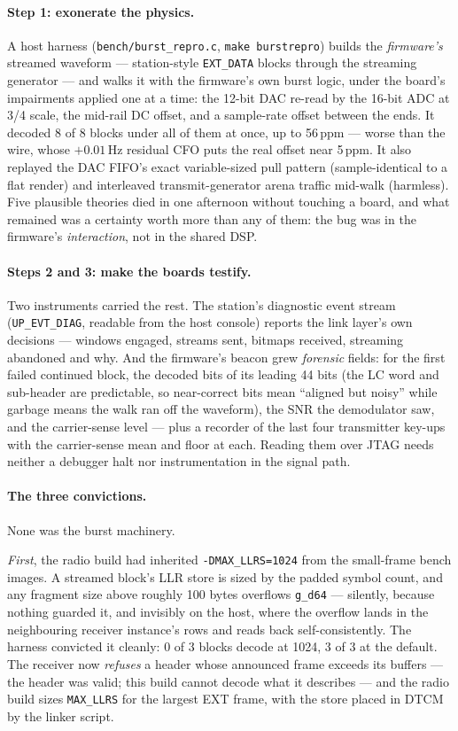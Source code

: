 \paragraph{Step 1: exonerate the physics.} A host harness
(\texttt{bench/burst\_repro.c}, \texttt{make burstrepro}) builds the
\emph{firmware's} streamed waveform --- station-style \texttt{EXT\_DATA}
blocks through the streaming generator --- and walks it with the
firmware's own burst logic, under the board's impairments applied one at
a time: the 12-bit DAC re-read by the 16-bit ADC at 3/4 scale, the
mid-rail DC offset, and a sample-rate offset between the ends. It
decoded 8 of 8 blocks under all of them at once, up to 56\,ppm ---
worse than the wire, whose $+0.01$\,Hz residual CFO puts the real
offset near 5\,ppm. It also replayed the DAC FIFO's exact
variable-sized pull pattern (sample-identical to a flat render) and
interleaved transmit-generator arena traffic mid-walk (harmless). Five
plausible theories died in one afternoon without touching a board, and
what remained was a certainty worth more than any of them: the bug was
in the firmware's \emph{interaction}, not in the shared DSP.

\paragraph{Steps 2 and 3: make the boards testify.} Two instruments
carried the rest. The station's diagnostic event stream
(\texttt{UP\_EVT\_DIAG}, readable from the host console) reports the
link layer's own decisions --- windows engaged, streams sent, bitmaps
received, streaming abandoned and why. And the firmware's beacon grew
\emph{forensic} fields: for the first failed continued block, the
decoded bits of its leading 44 bits (the LC word and sub-header are
predictable, so near-correct bits mean ``aligned but noisy'' while
garbage means the walk ran off the waveform), the SNR the demodulator
saw, and the carrier-sense level --- plus a recorder of the last four
transmitter key-ups with the carrier-sense mean and floor at each.
Reading them over JTAG needs neither a debugger halt nor
instrumentation in the signal path.

\paragraph{The three convictions.} None was the burst machinery.

\emph{First}, the radio build had inherited \texttt{-DMAX\_LLRS=1024}
from the small-frame bench images. A streamed block's LLR store is
sized by the padded symbol count, and any fragment size above roughly
100 bytes overflows \texttt{g\_d64} --- silently, because nothing
guarded it, and invisibly on the host, where the overflow lands in the
neighbouring receiver instance's rows and reads back self-consistently.
The harness convicted it cleanly: 0 of 3 blocks decode at 1024, 3 of 3
at the default. The receiver now \emph{refuses} a header whose
announced frame exceeds its buffers --- the header was valid; this
build cannot decode what it describes --- and the radio build sizes
\texttt{MAX\_LLRS} for the largest EXT frame, with the store placed in
DTCM by the linker script.

